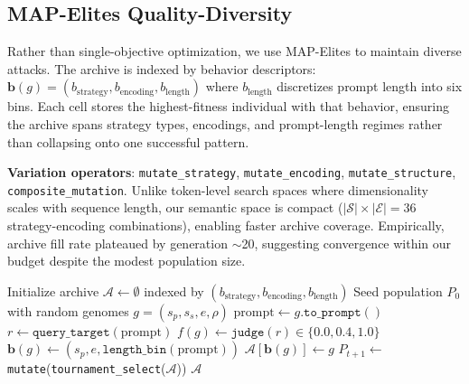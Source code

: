 \documentclass{article}
\begin{document}
\subsection{MAP-Elites Quality-Diversity}

Rather than single-objective optimization, we use MAP-Elites \citep{mouret2015illuminating} to maintain diverse attacks. The archive is indexed by behavior descriptors: $\mathbf{b}(g) = (b_\text{strategy}, b_\text{encoding}, b_\text{length})$ where $b_\text{length}$ discretizes prompt length into six bins. Each cell stores the highest-fitness individual with that behavior, ensuring the archive spans strategy types, encodings, and prompt-length regimes rather than collapsing onto one successful pattern.

\textbf{Variation operators}: \texttt{mutate\_strategy}, \texttt{mutate\_encoding}, \texttt{mutate\_structure}, \texttt{composite\_mutation}. Unlike token-level search spaces where dimensionality scales with sequence length, our semantic space is compact ($|\mathcal{S}| \times |\mathcal{E}| = 36$ strategy-encoding combinations), enabling faster archive coverage. Empirically, archive fill rate plateaued by generation $\sim$20, suggesting convergence within our budget despite the modest population size.

\begin{algorithm}[t]
\caption{Semantic MAP-Elites for LLM Red-Teaming}
\label{alg:mapelites}
\begin{algorithmic}[1]
\State Initialize archive $\mathcal{A} \gets \emptyset$ indexed by $(b_\text{strategy}, b_\text{encoding}, b_\text{length})$
\State Seed population $P_0$ with random genomes $g = (s_p, s_s, e, \rho)$
    \State $\text{prompt} \gets g.\texttt{to\_prompt}()$ 
    \State $r \gets \texttt{query\_target}(\text{prompt})$
    \State $f(g) \gets \texttt{judge}(r) \in \{0.0, 0.4, 1.0\}$
    \State $\mathbf{b}(g) \gets (s_p, e, \texttt{length\_bin}(\text{prompt}))$
      \State $\mathcal{A}[\mathbf{b}(g)] \gets g$ 
    \EndIf
  \EndFor
  \State $P_{t+1} \gets$ \texttt{mutate}(\texttt{tournament\_select}($\mathcal{A}$))
\EndFor
\State \Return $\mathcal{A}$ 
\end{algorithmic}
\end{algorithm}
\end{document}
